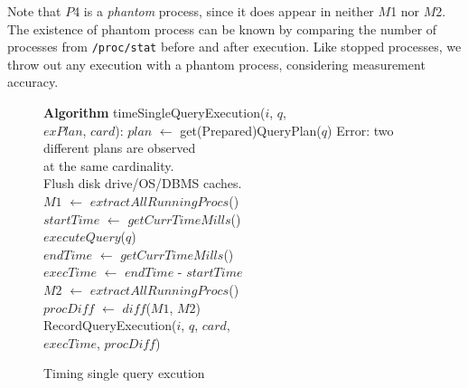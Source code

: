 Note that $P$4 is a {\em phantom} process, since it does appear 
in neither $M$1 nor $M$2. 
The existence of phantom process can be known by comparing 
the number of processes from {\tt /proc/stat} before and after execution.
Like stopped processes, we throw out any execution with a phantom process, 
considering measurement accuracy.

\begin{figure}[t]
\begin{center}
\begin{algorithmic}
{\bf Algorithm} timeSingleQueryExecution($i$, $q$, \\
						\hspace{44.0mm}$exPlan$, $card$):
\STATE $plan$ $\leftarrow$ get(Prepared)QueryPlan($q$)
	\STATE Error: two different plans are observed \\ 
	at the same cardinality. \\
\ENDIF
\STATE Flush disk drive/OS/DBMS caches. \\
\STATE $M1$ $\leftarrow$ $extractAllRunningProcs$() \\
\STATE $startTime$ $\leftarrow$ $getCurrTimeMills$() \\
\STATE $executeQuery$($q$) \\ 
\STATE $endTime$ $\leftarrow$ $getCurrTimeMills$() \\	
\STATE $execTime$ $\leftarrow$ $endTime$ - $startTime$ \\	
\STATE $M2$ $\leftarrow$ $extractAllRunningProcs$() \\
\STATE $procDiff$ $\leftarrow$ $diff$($M1$, $M2$) \\	
\STATE RecordQueryExecution($i$, $q$, $card$, \\ 
			\hspace{34.0mm}$execTime$, $procDiff$) \\
\end{algorithmic}
\caption{Timing single query excution\label{alg:timing}}
\end{center}
\end{figure}
